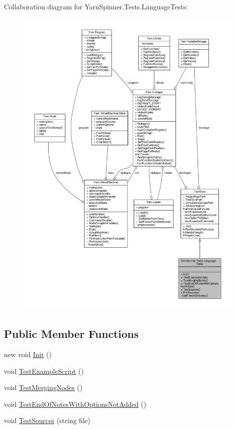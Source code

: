 Collaboration diagram for Yarn\-Spinner.\-Tests.\-Language\-Tests\-:
\nopagebreak
\begin{figure}[H]
\begin{center}
\leavevmode
\includegraphics[width=350pt]{a00726}
\end{center}
\end{figure}
\subsection*{Public Member Functions}
\begin{DoxyCompactItemize}
\item 
new void \hyperlink{a00120_ae0d1fb752df07e24b0d11db25e0c17c4}{Init} ()
\item 
void \hyperlink{a00120_a1d044fd44e610a35ef09d486eb06ee37}{Test\-Example\-Script} ()
\item 
void \hyperlink{a00120_a4da987e2dbc65b35cc6bd07392f71453}{Test\-Merging\-Nodes} ()
\item 
void \hyperlink{a00120_a6cc57344745b5fb315abdeacdd23b659}{Test\-End\-Of\-Notes\-With\-Options\-Not\-Added} ()
\item 
void \hyperlink{a00120_a1fb5f217de912475860fcde067418f83}{Test\-Sources} (string file)
\end{DoxyCompactItemize}
